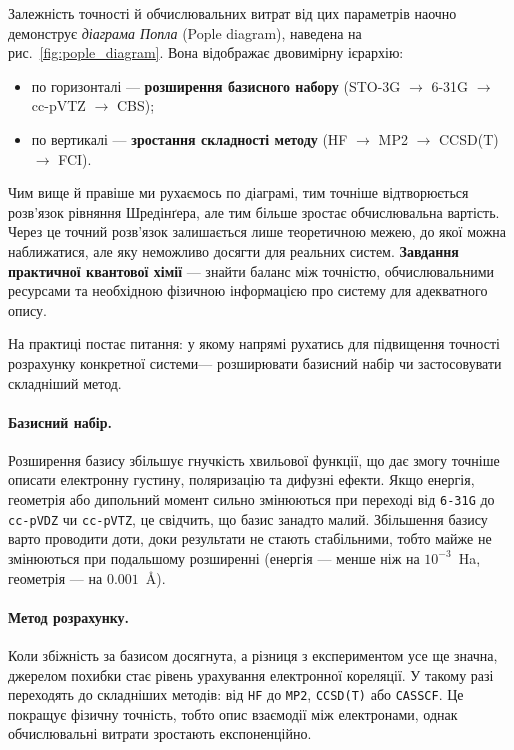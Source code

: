 Залежність точності й обчислювальних витрат від цих параметрів наочно демонструє \emph{діаграма Попла} (Pople diagram), наведена на рис.~\ref{fig:pople_diagram}. Вона відображає двовимірну ієрархію:
\begin{itemize}
  \item по горизонталі --- \textbf{розширення базисного набору}
        (STO-3G $\to$ 6-31G $\to$ cc-pVTZ $\to$ CBS);
  \item по вертикалі --- \textbf{зростання складності методу}
        (HF $\to$ MP2 $\to$ CCSD(T) $\to$ FCI).
\end{itemize}


Чим вище й правіше ми рухаємось по діаграмі,
тим точніше відтворюється розв’язок рівняння Шредінґера,
але тим більше зростає обчислювальна вартість.
Через це точний розв’язок залишається лише теоретичною межею,
до якої можна наближатися, але яку неможливо досягти для реальних систем.
\textbf{Завдання практичної квантової хімії} --- знайти баланс між точністю, обчислювальними ресурсами
та необхідною фізичною інформацією про систему для адекватного опису.

На практиці постає питання: у якому напрямі рухатись для підвищення точності розрахунку конкретної системи---
розширювати базисний набір чи застосовувати складніший метод.

\paragraph{Базисний набір.}
Розширення базису збільшує гнучкість хвильової функції, що дає змогу точніше описати електронну густину, поляризацію та дифузні ефекти.
Якщо енергія, геометрія або дипольний момент сильно змінюються при переході від \texttt{6-31G} до \texttt{cc-pVDZ} чи \texttt{cc-pVTZ}, це свідчить, що базис занадто малий.
Збільшення базису варто проводити доти, доки результати не стають стабільними, тобто майже не змінюються при подальшому розширенні (енергія --- менше ніж на $10^{-3}$~Ha, геометрія --- на $0.001$~Å).

\paragraph{Метод розрахунку.}
Коли збіжність за базисом досягнута, а різниця з експериментом усе ще значна,
джерелом похибки стає рівень урахування електронної кореляції.
У такому разі переходять до складніших методів: від \texttt{HF} до \texttt{MP2}, \texttt{CCSD(T)} або \texttt{CASSCF}.
Це покращує фізичну точність, тобто опис взаємодії між електронами, однак обчислювальні витрати зростають експоненційно.

